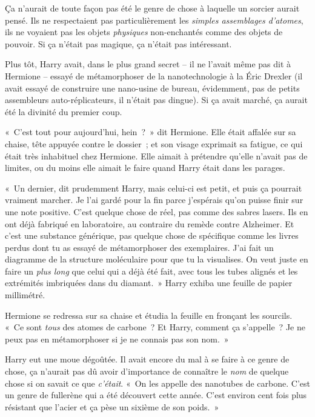 Ça n'aurait de toute façon pas été le genre de chose à laquelle un sorcier aurait pensé.
Ils ne respectaient pas particulièrement les \emph{simples assemblages d'atomes}, ils ne voyaient pas les objets \emph{physiques} non-enchantés comme des objets de pouvoir.
Si ça n'était pas magique, ça n'était pas intéressant.

Plus tôt, Harry avait, dans le plus grand secret -- il ne l'avait même pas dit à Hermione -- essayé de métamorphoser de la nanotechnologie à la Éric Drexler (il avait essayé de construire une nano-usine de bureau, évidemment, pas de petits assembleurs auto-réplicateurs, il n'était pas dingue).
Si ça avait marché, ça aurait été la divinité du premier coup.

«~C'est tout pour aujourd'hui, hein~?~»
dit Hermione.
Elle était affalée sur sa chaise, tête appuyée contre le dossier~; et son visage exprimait sa fatigue, ce qui était très inhabituel chez Hermione.
Elle aimait à prétendre qu'elle n'avait pas de limites, ou du moins elle aimait le faire quand Harry était dans les parages.

«~Un dernier, dit prudemment Harry, mais celui-ci est petit, et puis ça pourrait vraiment marcher.
Je l'ai gardé pour la fin parce j'espérais qu'on puisse finir sur une note positive.
C'est quelque chose de réel, pas comme des sabres lasers.
Ils en ont déjà fabriqué en laboratoire, au contraire du remède contre Alzheimer.
Et c'est une substance générique, pas quelque chose de spécifique comme les livres perdus dont tu as essayé de métamorphoser des exemplaires.
J'ai fait un diagramme de la structure moléculaire pour que tu la visualises.
On veut juste en faire un \emph{plus long} que celui qui a déjà été fait, avec tous les tubes alignés et les extrémités imbriquées dans du diamant.~»
Harry exhiba une feuille de papier millimétré.

Hermione se redressa sur sa chaise et étudia la feuille en fronçant les sourcils.
«~Ce sont \emph{tous} des atomes de carbone~?
Et Harry, comment ça s'appelle~?
Je ne peux pas en métamorphoser si je ne connais pas son nom.~»

Harry eut une moue dégoûtée.
Il avait encore du mal à se faire à ce genre de chose, ça n'aurait pas dû avoir d'importance de connaître le \emph{nom} de quelque chose si on savait ce que \emph{c'était}.
«~On les appelle des nanotubes de carbone.
C'est un genre de fullerène qui a été découvert cette année.
C'est environ cent fois plus résistant que l'acier et ça pèse un sixième de son poids.~»

